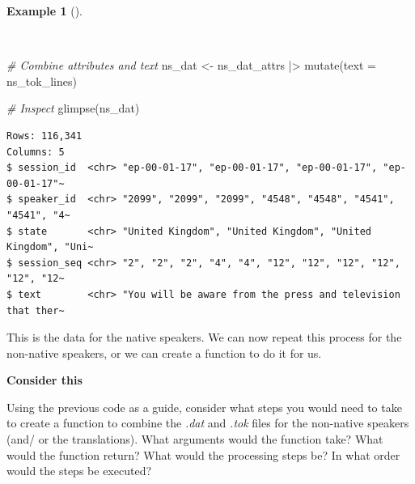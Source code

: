 \documentclass[
  letterpaper,
  krantz1]{latex/krantz-mod}
\newenvironment{Shaded}{\begin{snugshade}}{\end{snugshade}}
\newcommand{\AttributeTok}[1]{\textcolor[rgb]{0.00,0.00,0.00}{#1}}
\newcommand{\CommentTok}[1]{\textcolor[rgb]{0.00,0.00,0.00}{\textit{#1}}}
\newcommand{\FunctionTok}[1]{\textcolor[rgb]{0.00,0.00,0.00}{#1}}
\newcommand{\NormalTok}[1]{\textcolor[rgb]{0.00,0.00,0.00}{#1}}
\newcommand{\OtherTok}[1]{\textcolor[rgb]{0.00,0.00,0.00}{#1}}
\newcommand{\SpecialCharTok}[1]{\textcolor[rgb]{0.00,0.00,0.00}{#1}}
\theoremstyle{definition}
\newtheorem{example}{Example}[chapter]
\theoremstyle{definition}
\theoremstyle{remark}
\begin{document}
\begin{example}[]\protect\hypertarget{exm-curate-enntt-combine-attributes-text}{}\label{exm-curate-enntt-combine-attributes-text}

~

\begin{Shaded}
\begin{Highlighting}[numbers=left,,]
\CommentTok{\# Combine attributes and text}
\NormalTok{ns\_dat }\OtherTok{\textless{}{-}}
\NormalTok{  ns\_dat\_attrs }\SpecialCharTok{|\textgreater{}}
  \FunctionTok{mutate}\NormalTok{(}\AttributeTok{text =}\NormalTok{ ns\_tok\_lines)}

\CommentTok{\# Inspect}
\FunctionTok{glimpse}\NormalTok{(ns\_dat)}
\end{Highlighting}
\end{Shaded}

\begin{verbatim}
Rows: 116,341
Columns: 5
$ session_id  <chr> "ep-00-01-17", "ep-00-01-17", "ep-00-01-17", "ep-00-01-17"~
$ speaker_id  <chr> "2099", "2099", "2099", "4548", "4548", "4541", "4541", "4~
$ state       <chr> "United Kingdom", "United Kingdom", "United Kingdom", "Uni~
$ session_seq <chr> "2", "2", "2", "4", "4", "12", "12", "12", "12", "12", "12~
$ text        <chr> "You will be aware from the press and television that ther~
\end{verbatim}

\end{example}

This is the data for the native speakers. We can now repeat this process
for the non-native speakers, or we can create a function to do it for
us.

\begin{tcolorbox}[enhanced jigsaw, leftrule=.75mm, colframe=quarto-callout-color-frame, left=2mm, colback=white, toprule=.15mm, breakable, arc=.35mm, opacityback=0, bottomrule=.15mm, rightrule=.15mm]

\textbf{ Consider this}

Using the previous code as a guide, consider what steps you would need
to take to create a function to combine the \emph{.dat} and \emph{.tok}
files for the non-native speakers (and/ or the translations). What
arguments would the function take? What would the function return? What
would the processing steps be? In what order would the steps be
executed?

\end{tcolorbox}
\end{document}
